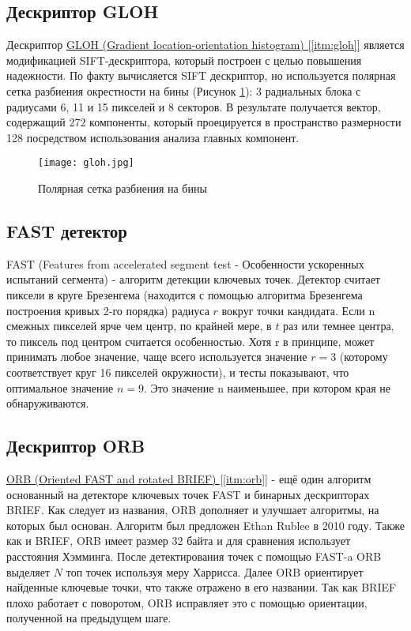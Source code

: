 \subsection{Дескриптор GLOH}

Дескриптор \hyperref[itm:gloh]{ GLOH (Gradient location-orientation histogram) [\ref{itm:gloh}]} является модификацией SIFT-дескриптора, который построен с целью повышения надежности. По факту вычисляется SIFT дескриптор, но используется полярная сетка разбиения окрестности на бины (Рисунок \ref{fig:gloh}): 3 радиальных блока с радиусами 6, 11 и 15 пикселей и 8 секторов. В результате получается вектор, содержащий 272 компоненты, который проецируется в пространство размерности 128 посредством использования анализа главных компонент.

\begin{figure}[h]
    \centering
    \texttt{[image: gloh.jpg]}
    \caption{Полярная сетка разбиения на бины}
    \label{fig:gloh}
\end{figure}

\subsection{FAST детектор}

FAST (Features from accelerated segment test - Особенности ускоренных испытаний сегмента) - алгоритм детекции ключевых точек. Детектор считает пиксели в круге Брезенгема (находится с помощью алгоритма Брезенгема построения кривых 2-го порядка) радиуса $r$ вокруг точки кандидата. Если n смежных пикселей ярче чем центр, по крайней мере, в $t$ раз или темнее центра, то пиксель под центром считается особенностью. Хотя r в принципе, может принимать любое значение, чаще всего используется значение $r=3$  (которому соответствует круг 16 пикселей окружности), и тесты показывают, что оптимальное значение $n=9$. Это значение n наименьшее, при котором края не обнаруживаются.

\subsection{Дескриптор ORB}

\hyperref[itm:orb]{ ORB (Oriented FAST and rotated BRIEF) [\ref{itm:orb}]} - ещё один алгоритм основанный на детекторе ключевых точек FAST и бинарных дескрипторах BRIEF. Как следует из названия, ORB дополняет и улучшает алгоритмы, на которых был основан. Алгоритм был предложен Ethan Rublee в 2010 году. Также как и BRIEF, ORB имеет размер 32 байта и для сравнения использует расстояния Хэмминга. После детектирования точек с помощью FAST-a ORB выделяет $N$ топ точек используя меру Харрисса. Далее ORB ориентирует найденные ключевые точки, что также отражено в его названии. Так как BRIEF плохо работает с поворотом, ORB исправляет это с помощью ориентации, полученной на предыдущем шаге.
